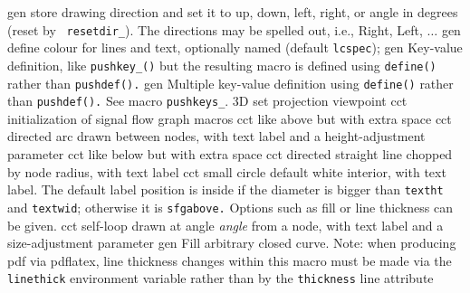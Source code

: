   {gen}
  {store drawing direction and set it to
    up, down, left, right, or angle in degrees (reset by {\tt
    resetdir\_}).  The directions may be spelled out, i.e., Right,
    Left, $\ldots$
   }
  {gen}
  {define colour for lines and text, optionally named (default
   {\tt lcspec}); }
  {gen}
  {Key-value definition, like {\tt pushkey\_()} but the resulting
  macro is defined using {\tt define()} rather than {\tt pushdef().}
   }
  {gen}
  {Multiple key-value definition using {\tt define()} rather than
   {\tt pushdef().} See macro {\tt pushkeys\_}.
   }
  {3D} {set projection viewpoint}
 {cct}
  {initialization of signal
  flow graph macros}
  {cct}
  {like above but with extra space}
  {cct}
  {directed arc drawn between nodes, with text label
    and a height-adjustment parameter }
  {cct}
  {like below but with extra space}
  {cct}
  {directed straight line chopped by node radius, with text label}
  {cct}
  {small circle default white interior, with text label. The default
  label position is inside if the diameter is bigger than {\tt textht}
  and {\tt textwid}; otherwise it is {\tt sfgabove.} Options such as
  fill or line thickness can be given.}
  {cct}
  {self-loop drawn at angle {\sl angle} from a node,
     with text label and a size-adjustment parameter }
  {gen}
  {Fill arbitrary closed curve. Note: when producing pdf via pdflatex, line
   thickness changes within this macro must be made via the {\tt linethick}
   environment variable rather than by the {\tt thickness} line attribute}
